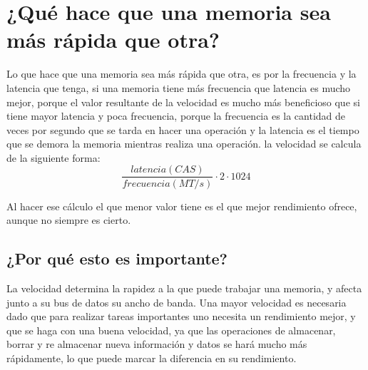 \documentclass{article}
\begin{document}
\section{¿Qué hace que una memoria sea más rápida que otra?}
        \vspace{0.5cm}
Lo que hace que una memoria sea más rápida que otra, es por la frecuencia y la latencia que tenga, si una memoria tiene más frecuencia que latencia es mucho mejor, porque el valor resultante de la velocidad es mucho más beneficioso que si tiene mayor latencia y poca frecuencia, porque la frecuencia es la cantidad de veces por segundo que se tarda en hacer una operación y la latencia es el tiempo que se demora la memoria mientras realiza una operación. la velocidad se calcula de la siguiente forma: \cite{frecuencia_latencia}
        \vspace{0.5cm}
$$\frac{latencia(CAS)}{frecuencia(MT/s )}\cdot2\cdot1024$$ \cite{formula}
        \vspace{0.5cm}
        
Al hacer ese cálculo el que menor valor tiene es el que mejor rendimiento ofrece, aunque no siempre es cierto.\cite{frecuencia_latencia}
\subsection{¿Por qué esto es importante?}
        \vspace{0.5cm}
La velocidad determina la rapidez a la que puede trabajar una memoria, y afecta junto a su bus de datos su ancho de banda. Una mayor velocidad es necesaria dado que para realizar tareas importantes uno necesita un rendimiento mejor, y que se haga con una buena velocidad, ya que las operaciones de almacenar, borrar y re almacenar nueva información y datos se hará mucho más rápidamente, lo que puede marcar la diferencia en su rendimiento. 
\cite{memoria_imp}







\newpage


\end{document}
